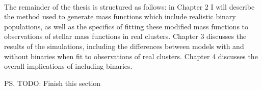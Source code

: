 \paragraph{}
The remainder of the thesis is structured as follows: in Chapter 2 I will describe the method used
to generate mass functions which include realistic binary populations, as well as the specifics of
fitting these modified mass functions to observations of stellar mass functions in real clusters.
Chapter 3 discusses the results of the simulations, including the differences between models with
and without binaries when fit to observations of real clusters. Chapter 4 discusses the overall
implications of including binaries.

\ps{ TODO: Finish this section}


